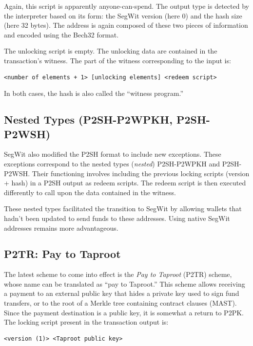 \documentclass[
  a5paper,
  smalldemyvopaper,10pt,twoside,onecolumn,openright,extrafontsizes,hidelinks]{memoir}
\begin{document}
Again, this script is apparently anyone-can-spend. The output type is
detected by the interpreter based on its form: the SegWit version (here
0) and the hash size (here 32 bytes). The address is again composed of
these two pieces of information and encoded using the Bech32 format.

The unlocking script is empty. The unlocking data are contained in the
transaction's witness. The part of the witness corresponding to the
input is:

\begin{verbatim}
<number of elements + 1> [unlocking elements] <redeem script>
\end{verbatim}

In both cases, the hash is also called the ``witness program.''

\subsection{Nested Types (P2SH-P2WPKH,
P2SH-P2WSH)}\label{nested-types-p2sh-p2wpkh-p2sh-p2wsh}

SegWit also modified the P2SH format to include new exceptions. These
exceptions correspond to the nested types (\emph{nested}) P2SH-P2WPKH
and P2SH-P2WSH. Their functioning involves including the previous
locking scripts (version + hash) in a P2SH output as redeem scripts. The
redeem script is then executed differently to call upon the data
contained in the witness.

These nested types facilitated the transition to SegWit by allowing
wallets that hadn't been updated to send funds to these addresses. Using
native SegWit addresses remains more advantageous.

\subsection{P2TR: Pay to Taproot}\label{p2tr-pay-to-taproot}

The latest scheme to come into effect is the \emph{Pay to Taproot}
(P2TR) scheme, whose name can be translated as ``pay to Taproot.'' This
scheme allows receiving a payment to an external public key that hides a
private key used to sign fund transfers, or to the root of a Merkle tree
containing contract clauses (MAST). Since the payment destination is a
public key, it is somewhat a return to P2PK. The locking script present
in the transaction output is:

\begin{verbatim}
<version (1)> <Taproot public key>
\end{verbatim}
\end{document}
